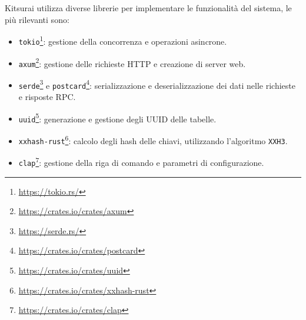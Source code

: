 Kitsurai utilizza diverse librerie per implementare le funzionalità del sistema, le più rilevanti sono:
\begin{itemize}
    \item \texttt{tokio}\footnote{\url{https://tokio.rs/}}: gestione della concorrenza e operazioni asincrone.
    \item \texttt{axum}\footnote{\url{https://crates.io/crates/axum}}: gestione delle richieste HTTP e creazione di server web.
    \item \texttt{serde}\footnote{\url{https://serde.rs/}} e \texttt{postcard}\footnote{\url{https://crates.io/crates/postcard}}: serializzazione e deserializzazione dei dati nelle richieste e risposte RPC.
    \item \texttt{uuid}\footnote{\url{https://crates.io/crates/uuid}}: generazione e gestione degli UUID delle tabelle.
    \item \texttt{xxhash-rust}\footnote{\url{https://crates.io/crates/xxhash-rust}}: calcolo degli hash delle chiavi, utilizzando l'algoritmo \texttt{XXH3}.
    \item \texttt{clap}\footnote{\url{https://crates.io/crates/clap}}: gestione della riga di comando e parametri di configurazione.
\end{itemize}
